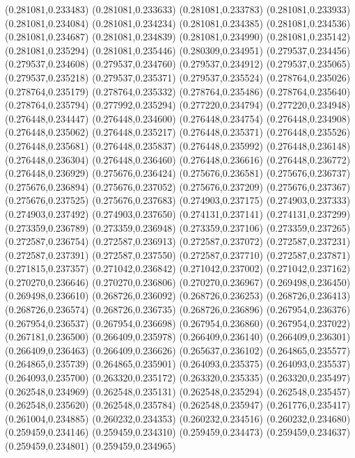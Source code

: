 (0.281081,0.233483)
(0.281081,0.233633)
(0.281081,0.233783)
(0.281081,0.233933)
(0.281081,0.234084)
(0.281081,0.234234)
(0.281081,0.234385)
(0.281081,0.234536)
(0.281081,0.234687)
(0.281081,0.234839)
(0.281081,0.234990)
(0.281081,0.235142)
(0.281081,0.235294)
(0.281081,0.235446)
(0.280309,0.234951)
(0.279537,0.234456)
(0.279537,0.234608)
(0.279537,0.234760)
(0.279537,0.234912)
(0.279537,0.235065)
(0.279537,0.235218)
(0.279537,0.235371)
(0.279537,0.235524)
(0.278764,0.235026)
(0.278764,0.235179)
(0.278764,0.235332)
(0.278764,0.235486)
(0.278764,0.235640)
(0.278764,0.235794)
(0.277992,0.235294)
(0.277220,0.234794)
(0.277220,0.234948)
(0.276448,0.234447)
(0.276448,0.234600)
(0.276448,0.234754)
(0.276448,0.234908)
(0.276448,0.235062)
(0.276448,0.235217)
(0.276448,0.235371)
(0.276448,0.235526)
(0.276448,0.235681)
(0.276448,0.235837)
(0.276448,0.235992)
(0.276448,0.236148)
(0.276448,0.236304)
(0.276448,0.236460)
(0.276448,0.236616)
(0.276448,0.236772)
(0.276448,0.236929)
(0.275676,0.236424)
(0.275676,0.236581)
(0.275676,0.236737)
(0.275676,0.236894)
(0.275676,0.237052)
(0.275676,0.237209)
(0.275676,0.237367)
(0.275676,0.237525)
(0.275676,0.237683)
(0.274903,0.237175)
(0.274903,0.237333)
(0.274903,0.237492)
(0.274903,0.237650)
(0.274131,0.237141)
(0.274131,0.237299)
(0.273359,0.236789)
(0.273359,0.236948)
(0.273359,0.237106)
(0.273359,0.237265)
(0.272587,0.236754)
(0.272587,0.236913)
(0.272587,0.237072)
(0.272587,0.237231)
(0.272587,0.237391)
(0.272587,0.237550)
(0.272587,0.237710)
(0.272587,0.237871)
(0.271815,0.237357)
(0.271042,0.236842)
(0.271042,0.237002)
(0.271042,0.237162)
(0.270270,0.236646)
(0.270270,0.236806)
(0.270270,0.236967)
(0.269498,0.236450)
(0.269498,0.236610)
(0.268726,0.236092)
(0.268726,0.236253)
(0.268726,0.236413)
(0.268726,0.236574)
(0.268726,0.236735)
(0.268726,0.236896)
(0.267954,0.236376)
(0.267954,0.236537)
(0.267954,0.236698)
(0.267954,0.236860)
(0.267954,0.237022)
(0.267181,0.236500)
(0.266409,0.235978)
(0.266409,0.236140)
(0.266409,0.236301)
(0.266409,0.236463)
(0.266409,0.236626)
(0.265637,0.236102)
(0.264865,0.235577)
(0.264865,0.235739)
(0.264865,0.235901)
(0.264093,0.235375)
(0.264093,0.235537)
(0.264093,0.235700)
(0.263320,0.235172)
(0.263320,0.235335)
(0.263320,0.235497)
(0.262548,0.234969)
(0.262548,0.235131)
(0.262548,0.235294)
(0.262548,0.235457)
(0.262548,0.235620)
(0.262548,0.235784)
(0.262548,0.235947)
(0.261776,0.235417)
(0.261004,0.234885)
(0.260232,0.234353)
(0.260232,0.234516)
(0.260232,0.234680)
(0.259459,0.234146)
(0.259459,0.234310)
(0.259459,0.234473)
(0.259459,0.234637)
(0.259459,0.234801)
(0.259459,0.234965)
